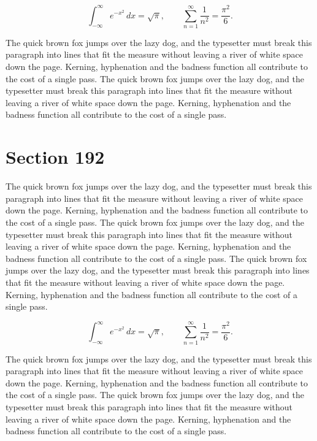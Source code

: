 \documentclass{article}
\begin{document}
\begin{equation}
\int_{-\infty}^{\infty} e^{-x^{2}}\,dx = \sqrt{\pi}, \qquad
\sum_{n=1}^{\infty} \frac{1}{n^{2}} = \frac{\pi^{2}}{6}.
\end{equation}

The quick brown fox jumps over the lazy dog, and the typesetter must break this paragraph into lines that fit the measure without leaving a river of white space down the page. Kerning, hyphenation and the badness function all contribute to the cost of a single pass. The quick brown fox jumps over the lazy dog, and the typesetter must break this paragraph into lines that fit the measure without leaving a river of white space down the page. Kerning, hyphenation and the badness function all contribute to the cost of a single pass. 
\section{Section 192}
The quick brown fox jumps over the lazy dog, and the typesetter must break this paragraph into lines that fit the measure without leaving a river of white space down the page. Kerning, hyphenation and the badness function all contribute to the cost of a single pass. The quick brown fox jumps over the lazy dog, and the typesetter must break this paragraph into lines that fit the measure without leaving a river of white space down the page. Kerning, hyphenation and the badness function all contribute to the cost of a single pass. The quick brown fox jumps over the lazy dog, and the typesetter must break this paragraph into lines that fit the measure without leaving a river of white space down the page. Kerning, hyphenation and the badness function all contribute to the cost of a single pass. 

\begin{equation}
\int_{-\infty}^{\infty} e^{-x^{2}}\,dx = \sqrt{\pi}, \qquad
\sum_{n=1}^{\infty} \frac{1}{n^{2}} = \frac{\pi^{2}}{6}.
\end{equation}

The quick brown fox jumps over the lazy dog, and the typesetter must break this paragraph into lines that fit the measure without leaving a river of white space down the page. Kerning, hyphenation and the badness function all contribute to the cost of a single pass. The quick brown fox jumps over the lazy dog, and the typesetter must break this paragraph into lines that fit the measure without leaving a river of white space down the page. Kerning, hyphenation and the badness function all contribute to the cost of a single pass. 
\end{document}
